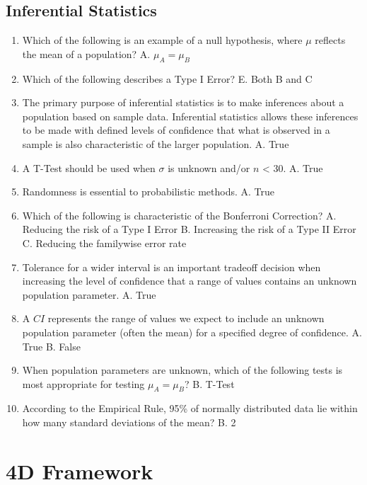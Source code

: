 \documentclass[]{book}
\begin{document}
\hypertarget{inferential-statistics}{%
\subsection{Inferential Statistics}\label{inferential-statistics}}

\begin{enumerate}
\def\labelenumi{\arabic{enumi}.}
\item
  Which of the following is an example of a null hypothesis, where \(\mu\) reflects the mean of a population?
  A. \(\mu_A = \mu_B\)
\item
  Which of the following describes a Type I Error?
  E. Both B and C
\item
  The primary purpose of inferential statistics is to make inferences about a population based on sample data. Inferential statistics allows these inferences to be made with defined levels of confidence that what is observed in a sample is also characteristic of the larger population.
  A. True
\item
  A T-Test should be used when \(\sigma\) is unknown and/or \(n\) \textless{} 30.
  A. True
\item
  Randomness is essential to probabilistic methods.
  A. True
\item
  Which of the following is characteristic of the Bonferroni Correction?
  A. Reducing the risk of a Type I Error
  B. Increasing the risk of a Type II Error
  C. Reducing the familywise error rate
\item
  Tolerance for a wider interval is an important tradeoff decision when increasing the level of confidence that a range of values contains an unknown population parameter.
  A. True
\item
  A \(CI\) represents the range of values we expect to include an unknown population parameter (often the mean) for a specified degree of confidence.
  A. True
  B. False
\item
  When population parameters are unknown, which of the following tests is most appropriate for testing \(\mu_A = \mu_B\)?
  B. T-Test
\item
  According to the Empirical Rule, 95\% of normally distributed data lie within how many standard deviations of the mean?
  B. 2
\end{enumerate}

\hypertarget{d-framework-1}{%
\section{4D Framework}\label{d-framework-1}}
\end{document}
